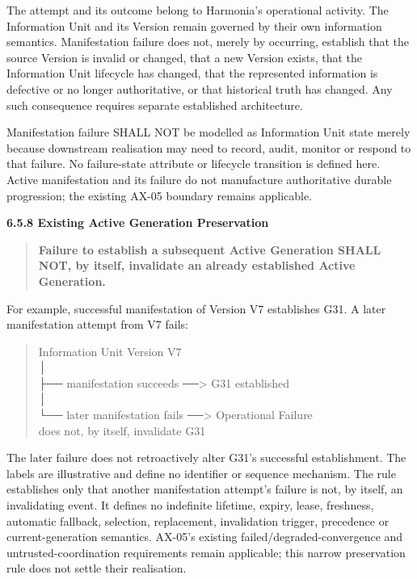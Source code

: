 The attempt and its outcome belong to Harmonia's operational activity. The
Information Unit and its Version remain governed by their own information
semantics. Manifestation failure does not, merely by occurring, establish that
the source Version is invalid or changed, that a new Version exists, that the
Information Unit lifecycle has changed, that the represented information is
defective or no longer authoritative, or that historical truth has changed.
Any such consequence requires separate established architecture.



Manifestation failure SHALL NOT be modelled as Information Unit state merely
because downstream realisation may need to record, audit, monitor or respond to
that failure. No failure-state attribute or lifecycle transition is defined here.
Active manifestation and its failure do not manufacture authoritative durable
progression; the existing AX-05 boundary remains applicable.



\par\medskip\textbf{6.5.8 Existing Active Generation Preservation}\par


\begin{quote}


\textbf{Failure to establish a subsequent Active Generation SHALL NOT, by itself, invalidate an already established Active Generation.}



\end{quote}


For example, successful manifestation of Version V7 establishes G31. A later
manifestation attempt from V7 fails:



\begin{quote}\small\ttfamily
Information Unit Version V7\\
      │\\
      ├── manifestation succeeds ──> G31 established\\
      │\\
      └── later manifestation fails ──> Operational Failure\\
                                       does not, by itself, invalidate G31\\

\end{quote}


The later failure does not retroactively alter G31's successful establishment.
The labels are illustrative and define no identifier or sequence mechanism.
The rule establishes only that another manifestation attempt's failure is not,
by itself, an invalidating event. It defines no indefinite lifetime, expiry,
lease, freshness, automatic fallback, selection, replacement, invalidation
trigger, precedence or current-generation semantics. AX-05's existing
failed/degraded-convergence and untrusted-coordination requirements remain
applicable; this narrow preservation rule does not settle their realisation.



